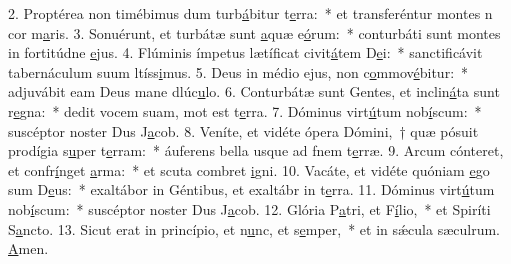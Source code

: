 2. Proptérea non timébimus dum turb\uline{á}bitur t\uline{e}rra:~* et transferéntur montes n cor m\uline{a}ris.
3. Sonuérunt, et turbátæ sunt \uline{a}quæ e\uline{ó}rum:~* conturbáti sunt montes in fortitúdne \uline{e}jus.
4. Flúminis ímpetus lætíficat civit\uline{á}tem D\uline{e}i:~* sanctificávit tabernáculum suum ltíss\uline{i}mus.
5. Deus in médio ejus, non c\uline{o}mmov\uline{é}bitur:~* adjuvábit eam Deus mane dlúc\uline{u}lo.
6. Conturbátæ sunt Gentes, et inclin\uline{á}ta sunt r\uline{e}gna:~* dedit vocem suam, mot est t\uline{e}rra.
7. Dóminus virt\uline{ú}tum nob\uline{í}scum:~* suscéptor noster Dus J\uline{a}cob.
8. Veníte, et vidéte ópera Dómini,~† quæ pósuit prodígia s\uline{u}per t\uline{e}rram:~* áuferens bella usque ad fnem t\uline{e}rræ.
9. Arcum cónteret, et confr\uline{í}nget \uline{a}rma:~* et scuta combret \uline{i}gni.
10. Vacáte, et vidéte quóniam \uline{e}go sum D\uline{e}us:~* exaltábor in Géntibus, et exaltábr in t\uline{e}rra.
11. Dóminus virt\uline{ú}tum nob\uline{í}scum:~* suscéptor noster Dus J\uline{a}cob.
12. Glória P\uline{a}tri, et F\uline{í}lio,~* et Spiríti S\uline{a}ncto.
13. Sicut erat in princípio, et n\uline{u}nc, et s\uline{e}mper,~* et in sǽcula sæculrum. \uline{A}men.
